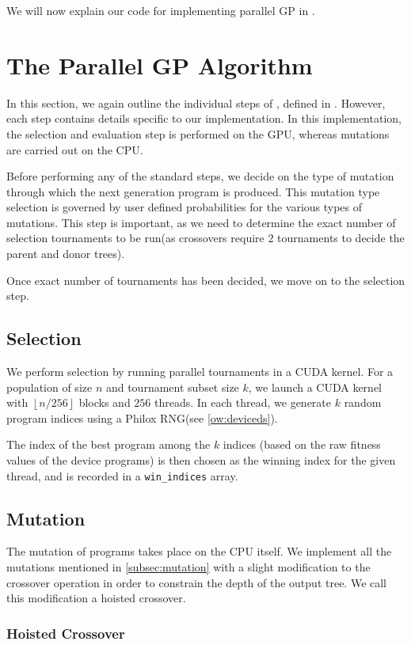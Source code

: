 We will now explain our code for implementing parallel GP in .
\section{The Parallel GP Algorithm}
\label{ow:paralgo}
In this section, we again outline the individual steps of , defined in . However, each step contains details specific to our implementation. In this implementation, the selection and evaluation step is performed on the GPU, whereas mutations are carried out on the CPU.

Before performing any of the standard steps, we decide on the type of mutation through which the next generation program is produced. This mutation type selection is governed by user defined probabilities for the various types of mutations. This step is important, as we need to determine the exact  number of selection tournaments to be run(as crossovers require $2$ tournaments to decide the parent and donor trees). 

Once exact number of tournaments has been decided, we move on to the selection step.

\subsection{Selection}
\label{ow:selection}
We perform selection by running parallel tournaments in a CUDA kernel. For a population of size $n$ and tournament subset size $k$, we launch a CUDA kernel with $\left\lfloor n/256 \right\rfloor $ blocks and $256$ threads. In each thread, we generate $k$ random program indices using a Philox RNG(see \cref{ow:deviceds}). 

The index of the best program among the $k$ indices (based on the raw fitness values of the device programs) is then chosen as the winning index for the given thread, and is recorded in a \lstinline!win_indices! array.

\subsection{Mutation}
\label{ow:mutation}
The mutation of programs takes place on the CPU itself. We implement all the mutations mentioned in \cref{subsec:mutation} with a slight modification to the crossover operation in order to constrain the depth of the output tree. We call this modification a hoisted crossover.  

\subsubsection{Hoisted Crossover}


